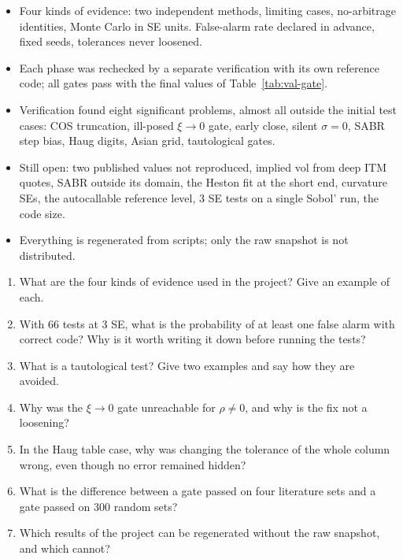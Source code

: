 \begin{riassunto}
\begin{itemize}
\item Four kinds of evidence: two independent methods, limiting cases, no-arbitrage identities, Monte Carlo in SE
units. False-alarm rate declared in advance, fixed seeds, tolerances never loosened.
\item Each phase was rechecked by a separate verification with its own reference code; all gates pass with the final
values of Table~\ref{tab:val-gate}.
\item Verification found eight significant problems, almost all outside the initial test cases: COS truncation,
ill-posed $\xi\to0$ gate, early close, silent ${\sigma=0}$, SABR step bias, Haug digits, Asian grid, tautological
gates.
\item Still open: two published values not reproduced, implied vol from deep ITM quotes, SABR outside its domain, the
Heston fit at the short end, curvature SEs, the autocallable reference level, 3 SE tests on a single Sobol' run, the
code size.
\item Everything is regenerated from scripts; only the raw snapshot is not distributed.
\end{itemize}
\end{riassunto}

\begin{domande}
\begin{enumerate}
\item What are the four kinds of evidence used in the project? Give an example of each.
\item With 66 tests at 3 SE, what is the probability of at least one false alarm with correct code? Why is it worth
writing it down before running the tests?
\item What is a tautological test? Give two examples and say how they are avoided.
\item Why was the $\xi\to0$ gate unreachable for $\rho\ne0$, and why is the fix not a loosening?
\item In the Haug table case, why was changing the tolerance of the whole column wrong, even though no error remained
hidden?
\item What is the difference between a gate passed on four literature sets and a gate passed on 300 random sets?
\item Which results of the project can be regenerated without the raw snapshot, and which cannot?
\end{enumerate}
\end{domande}
